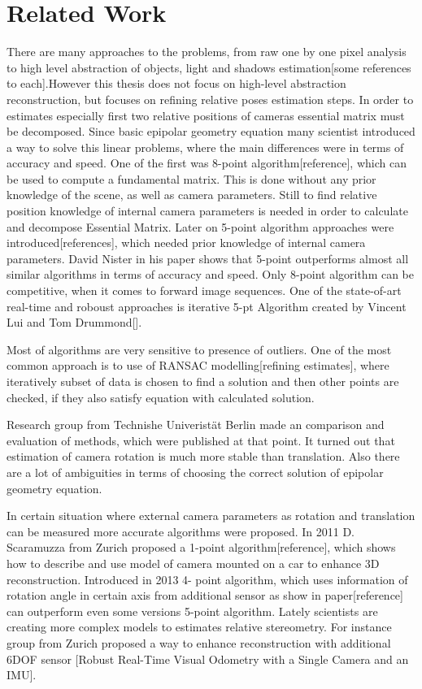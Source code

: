 
\chapter{Related Work} %
There are many approaches to the problems, from raw one by one pixel analysis to high level abstraction of objects, light and shadows estimation[some references to each].However this thesis does not focus on high-level abstraction reconstruction, but focuses on refining relative poses estimation steps. In order to estimates especially first two relative positions of cameras essential matrix must be decomposed.
Since basic epipolar geometry equation many scientist introduced a way to solve this linear problems, where the main differences were in terms of accuracy and speed. One of the first was 8-point algorithm[reference], which can be used to compute a fundamental matrix. This is done without any prior knowledge of the scene, as well as camera parameters. Still to find relative position knowledge of internal camera parameters is needed in order to calculate and decompose Essential Matrix. Later on 5-point algorithm approaches were introduced[references], which needed  prior knowledge of internal camera parameters. David Nister in his paper shows that 5-point outperforms almost all similar algorithms in terms of accuracy and speed. Only 8-point algorithm can be competitive, when it comes to forward image sequences. One of the state-of-art real-time and roboust approaches is iterative 5-pt Algorithm created by Vincent Lui
and Tom Drummond[].

 Most of algorithms are very sensitive to presence of outliers. One of the most common approach is to use of RANSAC modelling[refining estimates], where iteratively  subset of data is chosen to find a solution and then other points are checked, if they also satisfy equation with calculated solution.

Research group from Technishe Univeristät Berlin  made an comparison and evaluation of methods, which were published at that point. It turned out that estimation of camera rotation is much more stable than translation. Also there are a lot of ambiguities in terms of choosing the correct solution of epipolar geometry equation. 

In certain situation where external camera parameters as rotation and translation can be measured more accurate algorithms were proposed.  In 2011 D. Scaramuzza from Zurich proposed a 1-point algorithm[reference], which shows how to describe and use model of camera mounted on a car to enhance 3D reconstruction. Introduced in 2013  4- point algorithm, which uses information of rotation angle in certain axis from additional sensor as show in paper[reference] can outperform even some versions 5-point algorithm. Lately scientists are creating more complex models to estimates relative stereometry. For instance group from Zurich proposed a way to enhance reconstruction with additional 6DOF sensor [Robust Real-Time Visual Odometry with a Single Camera and an IMU].

